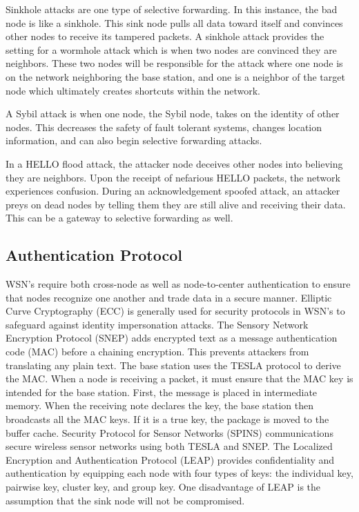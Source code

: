 \smallskip

Sinkhole attacks are one type of selective forwarding. In this instance, the bad node is like a sinkhole. This sink node pulls all data toward itself and convinces other nodes to receive its tampered packets. A sinkhole attack provides the setting for a wormhole attack which is when two nodes are convinced they are neighbors. These two nodes will be responsible for the attack where one node is on the network neighboring the base station, and one is a neighbor of the target node which ultimately creates shortcuts within the network.

\smallskip

A Sybil attack is when one node, the Sybil node, takes on the identity of other nodes. This decreases the safety of fault tolerant systems, changes location information, and can also begin selective forwarding attacks.

\smallskip

In a HELLO flood attack, the attacker node deceives other nodes into believing they are neighbors. Upon the receipt of nefarious HELLO packets, the network experiences confusion. 
During an acknowledgement spoofed attack, an attacker preys on dead nodes by telling them they are still alive and receiving their data. This can be a gateway to selective forwarding as well.

\subsection {Authentication Protocol}

WSN’s require both cross-node as well as node-to-center authentication to ensure that nodes recognize one another and trade data in a secure manner. Elliptic Curve Cryptography (ECC) is generally used for security protocols in WSN’s to safeguard against identity impersonation attacks. The Sensory Network Encryption Protocol (SNEP) adds encrypted text as a message authentication code (MAC) before a chaining encryption. This prevents attackers from translating any plain text. The base station uses the TESLA protocol to derive the MAC. When a node is receiving a packet, it must ensure that the MAC key is intended for the base station. First, the message is placed in intermediate memory. When the receiving note declares the key, the base station then broadcasts all the MAC keys. If it is a true key, the package is moved to the buffer cache. Security Protocol for Sensor Networks (SPINS) communications secure wireless sensor networks using both TESLA and SNEP. The Localized Encryption and Authentication Protocol (LEAP) provides confidentiality and authentication by equipping each node with four types of keys: the individual key, pairwise key, cluster key, and group key. One disadvantage of LEAP is the assumption that the sink node will not be compromised. \cite {karakaya2018survey}

